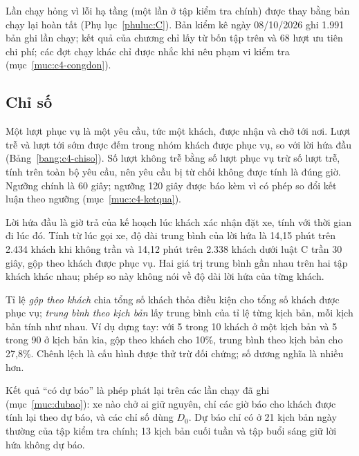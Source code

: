 Lần chạy hỏng vì lỗi hạ tầng (một lần ở tập kiểm tra chính) được thay bằng bản chạy lại hoàn tất (Phụ
lục~\ref{phuluc:C}). Bản kiểm kê ngày 08/10/2026 ghi 1.991 bản ghi lần chạy; kết quả của chương chỉ lấy từ bốn tập
trên và 68 lượt ưu tiên chi phí; các đợt chạy khác chỉ được nhắc khi nêu phạm vi kiểm tra (mục~\ref{muc:c4-congdon}).

\subsection{Chỉ số}
\label{muc:c4-chiso}

Một lượt phục vụ là một yêu cầu, tức một khách, được nhận và chở tới nơi. Lượt trễ và lượt tới sớm được đếm trong nhóm
khách được phục vụ, so với lời hứa đầu (Bảng~\ref{bang:c4-chiso}). Số lượt không trễ bằng số lượt phục vụ trừ số lượt
trễ, tính trên toàn bộ yêu cầu, nên yêu cầu bị từ chối không được tính là đúng giờ. Ngưỡng chính là 60 giây; ngưỡng
120 giây được báo kèm vì có phép so đổi kết luận theo ngưỡng (mục~\ref{muc:c4-ketqua}).

Lời hứa đầu là giờ trả của kế hoạch lúc khách xác nhận đặt xe, tính với thời gian đi lúc đó. Tính từ lúc gọi xe, độ dài
trung bình của lời hứa là 14,15 phút trên 2.434 khách khi không trần và 14,12 phút trên 2.338 khách dưới luật C trần 30
giây, gộp theo khách được phục vụ. Hai giá trị trung bình gần nhau trên hai tập khách khác nhau; phép so này không nói
về độ dài lời hứa của từng khách.

Tỉ lệ \emph{gộp theo khách} chia tổng số khách thỏa điều kiện cho tổng số khách được phục vụ; \emph{trung bình theo
kịch bản} lấy trung bình của tỉ lệ từng kịch bản, mỗi kịch bản tính như nhau. Ví dụ dựng tay: với 5 trong 10 khách ở
một kịch bản và 5 trong 90 ở kịch bản kia, gộp theo khách cho 10\%, trung bình theo kịch bản cho 27,8\%. Chênh lệch là
cấu hình được thử trừ đối chứng; số dương nghĩa là nhiều hơn.

Kết quả ``có dự báo'' là phép phát lại trên các lần chạy đã ghi (mục~\ref{muc:dubao}): xe nào chở ai giữ nguyên, chỉ
các giờ báo cho khách được tính lại theo dự báo, và các chỉ số dùng $D_0$. Dự báo chỉ có ở 21 kịch bản ngày thường của
tập kiểm tra chính; 13 kịch bản cuối tuần và tập buổi sáng giữ lời hứa không dự báo.

